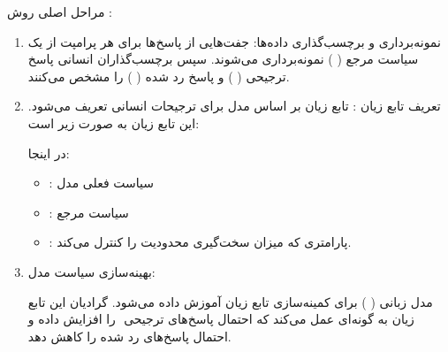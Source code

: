 \documentclass[11pt, a4paper, oneside]{book}
\begin{document}
				مراحل اصلی روش :
				\begin{enumerate}
					
					\item {\large نمونه‌برداری و برچسب‌گذاری داده‌ها}:
					جفت‌هایی از پاسخ‌ها 
					​
					برای هر پرامپت 
					از یک سیاست مرجع (
					) نمونه‌برداری می‌شوند. سپس برچسب‌گذاران انسانی پاسخ ترجیحی (
					) و پاسخ رد شده (
					) را مشخص می‌کنند.
					
					\item {\large تعریف تابع زیان }:
					تابع زیان بر اساس مدل  برای ترجیحات انسانی تعریف می‌شود. این تابع زیان به صورت زیر است:
					
					\begin{center}
					\end{center}
					
					در اینجا:
					
					\begin{itemize}
						
						\item {\large {}}: سیاست فعلی مدل
						
						\item {\large {}}: سیاست مرجع
						
						\item {\large \lr{$\beta$}}:‌ پارامتری که میزان سخت‌گیری محدودیت  را کنترل می‌کند.

					\end{itemize}
					
					\item {\large بهینه‌سازی سیاست مدل}:
					
					مدل زبانی (
					\lr{$\pi_\theta$}
					) برای کمینه‌سازی تابع زیان 
					آموزش داده می‌شود. گرادیان این تابع زیان به گونه‌ای عمل می‌کند که احتمال پاسخ‌های ترجیحی 
					​
					را افزایش داده و احتمال پاسخ‌های رد شده 
					را کاهش دهد.
					
				\end{enumerate}
				
\end{document}
